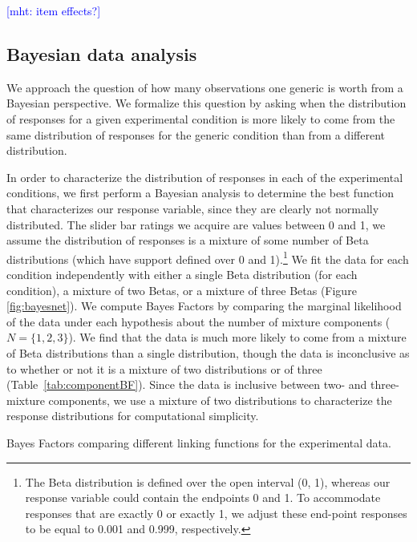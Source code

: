\documentclass[10pt,letterpaper]{article}
\newcommand{\mht}[1]{\textcolor{Blue}{[mht: #1]}}
\begin{document}
\mht{item effects?}


\subsection{Bayesian data analysis}

We approach the question of how many observations one generic is worth from a Bayesian perspective. 
We formalize this question by asking when the distribution of responses for a given experimental condition is more likely to come from the same distribution of responses for the generic condition than from a different distribution. 

In order to characterize the distribution of responses in each of the experimental conditions, we first perform a Bayesian analysis to determine the best function that characterizes our response variable, since they are clearly not normally distributed.
The slider bar ratings we acquire are values between 0 and 1, we assume the distribution of responses is a mixture of some number of Beta distributions (which have support defined over 0 and 1).\footnote{The Beta distribution is defined over the open interval (0, 1), whereas our response variable could contain the endpoints 0 and 1. To accommodate responses that are exactly 0 or exactly 1, we adjust these end-point responses to be equal to 0.001 and 0.999, respectively.}
We fit the data for each condition independently with either a single Beta distribution (for each condition), a mixture of two Betas, or a mixture of three Betas (Figure \ref{fig:bayesnet}). 
We compute Bayes Factors by comparing the marginal likelihood of the data under each hypothesis about the number of mixture components ($N = \{1, 2, 3\}$).
We find that the data is much more likely to come from a mixture of Beta distributions than a single distribution, though the data is inconclusive as to whether or not it is a mixture of two distributions or of three (Table~\ref{tab:componentBF}). 
Since the data is inclusive between two- and three- mixture components, we use a mixture of two distributions to characterize the response distributions for computational simplicity. 


\begin{center}
  \begin{table}[h]
    \centering
    \caption{Bayes Factors comparing different linking functions for the experimental data.}
    \label{tab:componentBF}
  \end{table}
\end{center}
\end{document}
